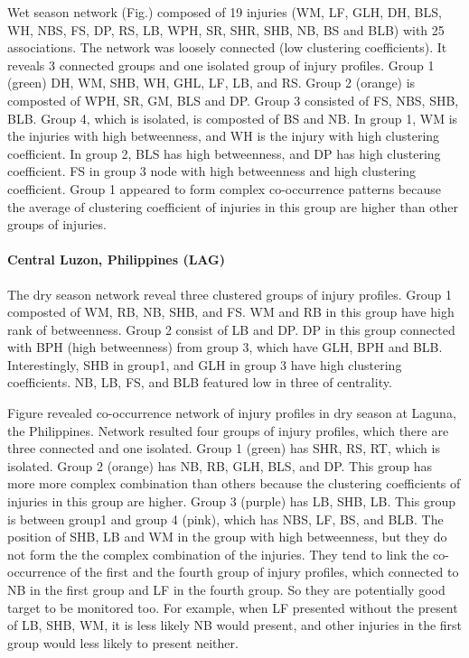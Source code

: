 Wet season network (Fig.) composed of 19 injuries (WM, LF, GLH, DH, BLS, WH, NBS, FS, DP, RS, LB, WPH, SR, SHR, SHB, NB, BS and BLB) with 25 associations. The network was loosely connected (low clustering coefficients). It reveals 3 connected groups and one isolated group of injury profiles. Group 1 (green) DH, WM, SHB, WH, GHL, LF, LB, and RS. Group 2 (orange) is composted of WPH, SR, GM, BLS and DP. Group 3 consisted of FS, NBS, SHB, BLB. Group 4, which is isolated, is composted of BS and NB. In group 1, WM is the injuries with high betweenness, and WH is the injury with high clustering coefficient. In group 2, BLS has high betweenness, and DP has high clustering coefficient. FS in group 3 node with high betweenness and high clustering coefficient. Group 1 appeared to form complex co-occurrence patterns because the average of clustering coefficient of injuries in this group are higher than other groups of injuries.  

\paragraph{Central Luzon, Philippines (LAG)}

The dry season network reveal three clustered groups of injury profiles. Group 1 composted of WM, RB, NB, SHB, and FS. WM and RB in this group have high rank of betweenness. Group 2 consist of LB and DP. DP in this group connected with BPH (high betweenness) from group 3, which have GLH, BPH and BLB. Interestingly, SHB in group1, and GLH in group 3 have high clustering coefficients. NB, LB, FS, and BLB featured low in three of centrality. 

Figure revealed co-occurrence network of injury profiles in dry season at Laguna, the Philippines. Network resulted four groups of injury profiles, which there are three connected and one isolated. Group 1 (green) has  SHR, RS, RT, which is isolated. Group 2 (orange) has NB, RB, GLH, BLS, and DP. This group has more more complex combination than others because the clustering coefficients of injuries in this group are higher. Group 3 (purple) has LB, SHB, LB. This group is between group1 and group 4 (pink), which has NBS, LF, BS, and BLB. The position of SHB, LB and WM in the group with high betweenness, but they do not form the the complex combination of the injuries. They tend to link the co-occurrence of the first and the fourth group of injury profiles, which connected to NB in the first group and LF in the fourth group. So they are potentially good target to be monitored too. For example, when LF presented without the present of LB, SHB, WM, it is less likely NB would present, and other injuries in the first group would less likely to present neither. 


